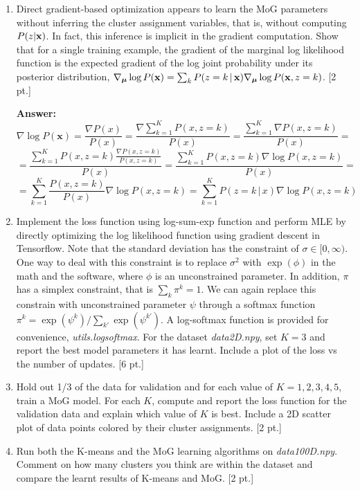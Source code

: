 \documentclass[12pt,letterpaper]{article}
\begin{document}
\begin{enumerate}
  \item Direct gradient-based optimization appears to learn the MoG parameters without inferring the cluster assignment variables, that is, without computing $P(z|\bold{x})$. In fact, this inference is implicit in the gradient computation. Show that for a single training example, the gradient of the marginal log likelihood function is the expected gradient of the log joint probability under its posterior distribution, $\nabla_{\boldsymbol{\mu}} \log P(\bold{x}) = \sum_k P(z=k\, | \, \bold{x}) \nabla_{\boldsymbol{\mu}} \log P(\bold{x}, z=k)$. [2 pt.] 

{\color{red} 
\textbf{Answer: }
    \[ \nabla \log P(\mathbf x) = \frac{\nabla P(x)}{P(x)} = \frac{\nabla \sum_{k=1}^{K}{P(x, z=k)}}{P(x)} = \frac{\sum_{k=1}^{K}{\nabla P(x, z=k)}}{P(x)} = \]
    \[= \frac{\sum_{k=1}^{K}{P(x,z=k)\frac{\nabla P(x, z=k)}{P(x,z=k)}}}{P(x)} = \frac{\sum_{k=1}^{K}{P(x,z=k)\nabla \log P(x, z=k)}}{P(x)} = \]
    \[= \sum_{k=1}^{K}{\frac{P(x,z=k)}{P(x)}\nabla \log P(x, z=k)} = \sum_{k=1}^{K}{P(z=k\, |\, x)\nabla \log P(x, z=k)}\]
}

\item Implement the loss function using log-sum-exp function and perform MLE by directly optimizing the log likelihood function using gradient descent in Tensorflow. Note that the standard deviation has the constraint of $\sigma \in [0, \infty)$. One way to deal with this constraint is to replace $\sigma^2$ with $\exp(\phi)$ in the math and the software, where $\phi$ is an unconstrained parameter. In addition, $\pi$ has a simplex constraint, that is $\sum_k \pi^k = 1$. We can again replace this constrain with unconstrained parameter $\psi$ through a softmax function $\pi^k = \exp(\psi^k)/\sum_{k'}\exp(\psi^{k'})$. A log-softmax function is provided for convenience, \textit{utils.logsoftmax}. For the dataset \textit{data2D.npy}, set $K=3$ and report the best model parameters it has learnt. Include a plot of the loss vs the number of updates. [6 pt.]

\item Hold out 1/3 of the data for validation and for each value of $K={1,2,3,4,5}$, train a MoG model. For each $K$, compute and report the loss function for the validation data and explain which value of $K$ is best. Include a 2D scatter plot of data points colored by their cluster assignments. [2 pt.] 

\item Run both the K-means and the MoG learning algorithms on \textit{data100D.npy}. Comment on how many clusters you think are within the dataset and compare the learnt results of K-means and MoG.  [2 pt.] 
\end{enumerate}
\end{document}
